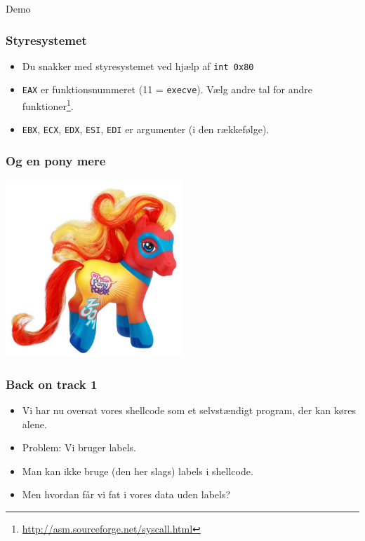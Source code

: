\documentclass[slidestop,compress,mathserif, xcolor=table]{beamer}
\begin{document}
\begin{frame}[c]
    \begin{center}
      \Huge Demo
    \end{center}
\end{frame}

\begin{frame}[c]
    \frametitle{Styresystemet}

    \begin{itemize}
        \pause
      \item Du snakker med styresystemet ved hjælp af \texttt{int 0x80}

        \pause
      \item \texttt{EAX} er funktionsnummeret (11 = \texttt{execve}). Vælg andre
        tal for andre
        funktioner\footnote<3->{\url{http://asm.sourceforge.net/syscall.html}}.

        \pause
      \item \texttt{EBX}, \texttt{ECX}, \texttt{EDX}, \texttt{ESI}, \texttt{EDI}
        er argumenter (i den rækkefølge).
    \end{itemize}
\end{frame}

\begin{frame}[c]
    \frametitle{Og en pony mere}
    \includegraphics[width=0.5\textwidth]{pony1}
\end{frame}

\begin{frame}[c]
    \frametitle{Back on track 1}

    \begin{itemize}
      \pause\item Vi har nu oversat vores shellcode som et selvstændigt
      program, der kan køres alene.

      \pause\item Problem: Vi bruger labels.

      \pause\item Man kan ikke bruge (den her slags) labels i shellcode.

      \pause\item Men hvordan får vi fat i vores data uden labels?
    \end{itemize}
\end{frame}
\end{document}
